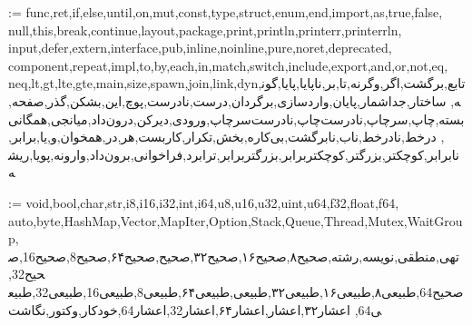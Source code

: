 \makeatletter

\providecommand{\latincodefont}{\salamcodeENfont}
\providecommand{\lr}[1]{\LRE{#1}}

\@for\salamfa@x:=%
  func,ret,if,else,until,on,mut,const,type,struct,enum,end,import,as,true,false,%
  null,this,break,continue,layout,package,print,println,printerr,printerrln,%
  input,defer,extern,interface,pub,inline,noinline,pure,noret,deprecated,%
  component,repeat,impl,to,by,each,in,match,switch,include,export,and,or,not,eq,%
  neq,lt,gt,lte,gte,main,size,spawn,join,link,dyn,تابع,برگشت,اگر,وگرنه,تا,بر,ناپایا,پایا,گونه,%
  ساختار,جداشمار,پایان,واردسازی,برگردان,درست,نادرست,پوچ,این,بشکن,گذر,صفحه,%
  بسته,چاپ,سرچاپ,نادرست‌چاپ,نادرست‌سرچاپ,ورودی,دیرکن,درون‌داد,میانجی,همگانی,%
  درخط,نادرخط,ناب,نابرگشت,بی‌کاره,بخش,تکرار,کاربست,هر,در,همخوان,و,یا,برابر,%
  نابرابر,کوچکتر,بزرگتر,کوچکتربرابر,بزرگتربرابر,ترابرد,فراخوانی,برون‌داد,وارونه,پویا,ریشه\do{%
    \expandafter\let\csname salamkw@\salamfa@x\endcsname\@empty}

\@for\salamfa@x:=%
  void,bool,char,str,i8,i16,i32,int,i64,u8,u16,u32,uint,u64,f32,float,f64,%
  auto,byte,HashMap,Vector,MapIter,Option,Stack,Queue,Thread,Mutex,WaitGroup,%
  تهی,منطقی,نویسه,رشته,صحیح۸,صحیح۱۶,صحیح۳۲,صحیح,صحیح۶۴,صحیح8,صحیح16,صحیح32,%
  صحیح64,طبیعی۸,طبیعی۱۶,طبیعی۳۲,طبیعی,طبیعی۶۴,طبیعی8,طبیعی16,طبیعی32,طبیعی64,%
  اعشار۳۲,اعشار,اعشار۶۴,اعشار32,اعشار64,خودکار,وکتور,نگاشت\do{%
    \expandafter\let\csname salamty@\salamfa@x\endcsname\@empty}

%
%

